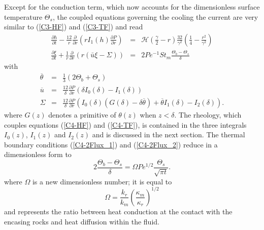 Except  for   the  conduction  term,   which  now  accounts   for  the
dimensionless  surface temperature  $\Theta_s$, the  coupled equations
governing the  cooling the current  are very similar  to (\ref{C3-HF})
and (\ref{C3-TF}) and read
\begin{eqnarray}
  \frac{\partial h}{\partial t}-\frac{12}{r}
  \frac{\partial}{\partial      r}
  \left( r I_1(h) \frac{\partial P}{\partial
  r}\right)
  \label{C4-HF}
  & =& \mathcal{H}(\frac{\gamma}{2}-r)\frac{32}{\gamma^{2}}\left(\frac{1}{4}-\frac{r^{2}}{\gamma^{2}}\right)\\
  \frac{\partial                                       \xi}{\partial
  t}+\frac{1}{r}\frac{\partial}{\partial                          r}
  \left( r\left(\bar{u}\xi-\Sigma\right)\right)&=&2Pe^{-1}St_m\frac{\Theta_b-\Theta_s}{\delta}\label{C4-TF}
\end{eqnarray}
with
\begin{eqnarray}
  \overline{\theta}&=&\frac{1}{3}\left(2\Theta_b+\Theta_s\right)\label{C4-tbar}\\
  \overline{u}&=&\frac{12}{\delta}
                  \frac{\partial
                  P}{\partial
                  r}\left(\delta
                  I_0(\delta)-I_1(\delta)\right)\\
  \Sigma &=& \frac{12}{\delta} \frac{\partial P}{\partial r}\left(I_0(\delta)\left(G(\delta)-\delta\overline{\theta}\right)+\overline{\theta}I_1(\delta)-I_2(\delta)\right).
\end{eqnarray}
where $G(z)$ denotes  a primitive of $\theta(z)$  when $z<\delta$. The
rheology, which couples equations  (\ref{C4-HF}) and (\ref{C4-TF}), is
contained in the  three integrals $I_0(z)$, $I_1(z)$  and $I_2(z)$ and
is discussed  in the  next section.   The thermal  boundary conditions
(\ref{C4-2Flux_1})  and (\ref{C4-2Flux_2})  reduce in  a dimensionless
form to
\begin{equation}
  2\frac{\Theta_b-\Theta_s}{\delta}               =               \Omega
  Pe^{1/2}\frac{\Theta_s}{\sqrt{\pi t}}.
  \label{C4-Boundary-Condi}
\end{equation}
where $\Omega$ is a new dimensionless number; it is equal to
\begin{equation}
  \Omega=\frac{k_r}{k_m}\left(\frac{\kappa_m}{\kappa_r}\right)^{1/2}\label{C4-omega}
\end{equation}
and represents the  ratio between heat conduction at  the contact with
the encasing rocks and heat diffusion within the fluid.

